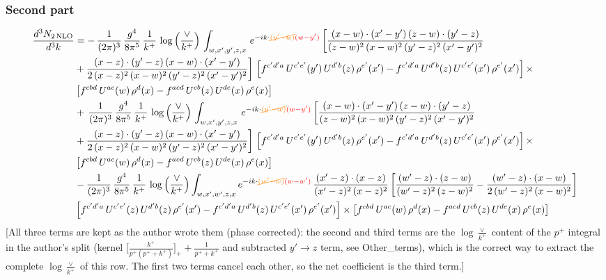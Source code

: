 \documentclass[9pt]{article}
\numberwithin{equation}{section}
\begin{document}
\subsubsection{Second part}
\begin{align}
 \frac{d^{3}N_{2\,\rm NLO}}{d^{3}k} & =    -\, \frac{1}{(2\pi)^{3}}\,\frac{g^{4}}{8\pi^{5}}\,\frac{1}{k^{+}}\,\log{\left(\frac{\vee}{k^{+}}\right)}\,\int_{w,x',y',z,x}\, e^{-ik\cdot {\color{orange}\cancel{(y'-w)}}{\color{red}(w-y')}}\,\bigg[\frac{(x-w)\cdot (x'-y')\,(z-w)\cdot (y'-z)}{(z-w)^{2}\,(x-w)^{2}\,(y'-z)^{2}\,(x'-y')^{2}}\notag \\ & +\frac{(x-z)\cdot (y'-z)\,(x-w)\cdot (x'-y')}{2\,(x-z)^{2}\,(x-w)^{2}\,(y'-z)^{2}\,(x'-y')^{2}}\bigg]\, \left[f^{c'd'a}\,U^{c'e'}(y')\,U^{d'b}(z)\,\rho^{e'}(x')-f^{c'd'a}\, 
    U^{d'b}(z)\,U^{c'e'}(x')\,\rho^{e'}(x')\right]\times\notag \\ &  \left[f^{cbd}\,U^{ac}(w)\,\rho^{d}(x) -f^{acd}\,U^{cb}(z)\,U^{de}(x)\,\rho^{e}(x)\right] \notag \\
&   +\, \frac{1}{(2\pi)^{3}}\,\frac{g^{4}}{8\pi^{5}}\,\frac{1}{k^{+}}\,\log{\left(\frac{\vee}{k^{+}}\right)}\,\int_{w,x',y',z,x}\, e^{-ik\cdot {\color{orange}\cancel{(y'-w)}}{\color{red}(w-y')}}\,\bigg[\frac{(x-w)\cdot (x'-y')\,(z-w)\cdot (y'-z)}{(z-w)^{2}\,(x-w)^{2}\,(y'-z)^{2}\,(x'-y')^{2}}\notag \\ &   +\frac{(x-z)\cdot (y'-z)\,(x-w)\cdot (x'-y')}{2\,(x-z)^{2}\,(x-w)^{2}\,(y'-z)^{2}\,(x'-y')^{2}}\bigg]\, \left[f^{c'd'a}\,U^{c'e'}(y')\,U^{d'b}(z)\,\rho^{e'}(x')-f^{c'd'a}\, 
    U^{d'b}(z)\,U^{c'e'}(x')\,\rho^{e'}(x')\right]\times\notag \\ &    \left[f^{cbd}\,U^{ac}(w)\,\rho^{d}(x) -f^{acd}\,U^{cb}(z)\,U^{de}(x)\,\rho^{e}(x)\right] \notag \\
&   -\frac{1}{(2\pi)^{3}}\,\frac{g^{4}}{8\pi^{5}}\,\frac{1}{k^{+}}\,\log{\left(\frac{\vee}{k^{+}}\right)}\int_{w,x',w',z,x} e^{-ik\cdot {\color{orange}\cancel{(w'-w)}}{\color{red}(w-w')}}\,\frac{(x'-z)\cdot (x-z)}{(x'-z)^{2}\,(x-z)^{2}}\,\bigg[\frac{(w'-z)\cdot (z-w)}{(w'-z)^{2}\,(z-w)^{2}}-\frac{(w'-z)\cdot (x-w)}{2\,(w'-z)^{2}\,(x-w)^{2}}\bigg]\notag \\
&   \left[f^{c'd'a}\,U^{c'e'}(z)\,U^{d'b}(z)\,\rho^{e'}(x')-f^{c'd'a}\, U^{d'b}(z)\,U^{c'e'}(x')\,\rho^{e'}(x')\right] \times\left[f^{cbd}\,U^{ac}(w)\,\rho^{d}(x) -f^{acd}\,U^{cb}(z)\,U^{de}(x)\,\rho^{e}(x)\right]
\end{align} {\color{red}[All three terms are kept as the author wrote them (phase corrected): the second and third terms are the $\log\frac{\vee}{k^{+}}$ content of the $p^{+}$ integral in the author's split (kernel $\big[\frac{k^{+}}{p^{+}(p^{+}+k^{+})}\big]_{+}+\frac{1}{p^{+}+k^{+}}$ and subtracted $y'\to z$ term, see Other\_terms), which is the correct way to extract the complete $\log\frac{\vee}{k^{+}}$ of this row. The first two terms cancel each other, so the net coefficient is the third term.]}\par\noindent
\end{document}
